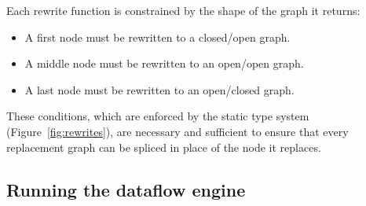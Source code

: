\documentclass[blockstyle,preprint,natbib,nocopyrightspace]{sigplanconf}
\def\finalremark#1{\relax}
\newcommand\delendum[1]{\relax\ifvmode\else\unskip\fi\relax}
\newcommand\figref[1]{Figure~\ref{fig:#1}}
\begin{document}
Each rewrite function is constrained by the shape of the graph it returns:
\begin{itemize}
\item
\iffalse
A first node with @BlockId@~$L$ must be rewritten to a closed/open
replacement graph which also begins with @BlockId@~$L$.
\delendum{Whoa!  What does it mean to say that a graph ``begins with $L$''?
Perhpas we just mean that the replacement grpah must include a block labelled $L$?}
\else
A first node must be rewritten to a closed/open
 graph.
\finalremark{Revisit graphs ``beginning with $L$''}
\fi
\item
A middle node must be rewritten to an open/open graph.
\item
A last node must be rewritten to an open/closed graph.
\end{itemize}
These conditions, which are enforced by the static type system
 (\figref{rewrites}), 
 are necessary and sufficient to ensure that 
every replacement graph can be spliced in place of the node it replaces.

\subsection{Running the dataflow engine}
\end{document}
